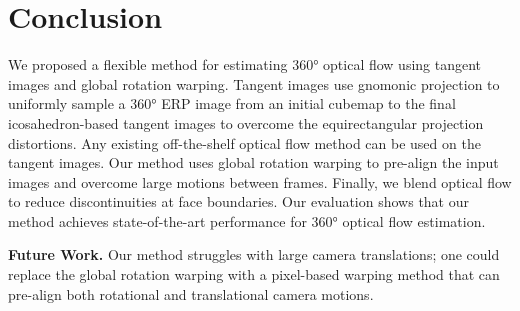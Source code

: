 \section{Conclusion}

We proposed a flexible method for estimating 360° optical flow using tangent images and global rotation warping.
%
Tangent images use gnomonic projection to uniformly sample a 360° ERP image from an initial cubemap to the final icosahedron-based tangent images to overcome the equirectangular projection distortions.
Any existing off-the-shelf optical flow method can be used on the tangent images.
%
Our method uses global rotation warping to pre-align the input images and overcome large motions between frames.
Finally, we blend optical flow to reduce discontinuities at face boundaries.
%
Our evaluation shows that our method achieves state-of-the-art performance for 360° optical flow estimation.

\textbf{Future Work.}
%
Our method struggles with large camera translations; one could replace the global rotation warping with a  pixel-based warping method that can pre-align both rotational and translational camera motions.


